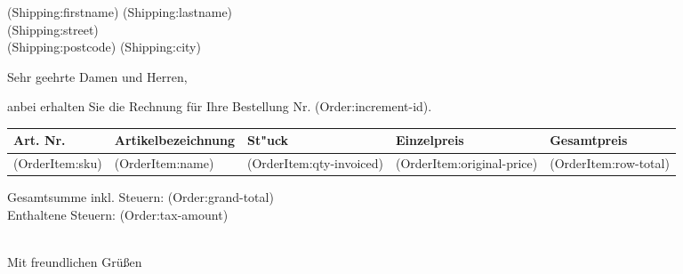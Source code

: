 \documentclass[DIN, pagenumber=false, parskip=half,%
               fromalign=right, fromphone=true, fromfax=true,
               fromrule=false]{scrlttr2}
\begin{document}
 

\begin{letter}{(Shipping:firstname) (Shipping:lastname) \\ (Shipping:street) \\ (Shipping:postcode) (Shipping:city)}

\opening{Sehr geehrte Damen und Herren,}

anbei erhalten Sie die Rechnung für Ihre Bestellung Nr. (Order:increment-id). \\


\begin{longtable}{p{2.5cm}p{6.5cm}p{2cm}p{2cm}p{2cm}}

\hline 	
Art. Nr. & Artikelbezeichnung & St"uck & Einzelpreis & Gesamtpreis\\
\hline 
(OrderItem:sku) & (OrderItem:name) & (OrderItem:qty-invoiced) &(OrderItem:original-price) & (OrderItem:row-total)\\
\hline 
\hline 
\end{longtable}
Gesamtsumme inkl. Steuern: (Order:grand-total) \\
Enthaltene Steuern: (Order:tax-amount) \\



\closing{\\ Mit freundlichen Grüßen}
\end{letter}
 
\end{document}

